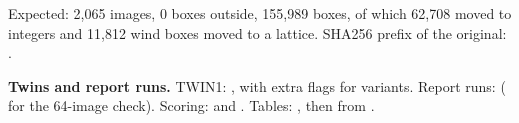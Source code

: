 Expected: 2,065 images, 0 boxes outside, 155,989 boxes, of which 62,708 moved to integers and 11,812 wind boxes moved to a lattice. SHA256 prefix of the original: .

\textbf{Twins and report runs.} TWIN1: , with extra flags for variants. Report runs:  ( for the 64-image check). Scoring:  and . Tables: , then  from .

